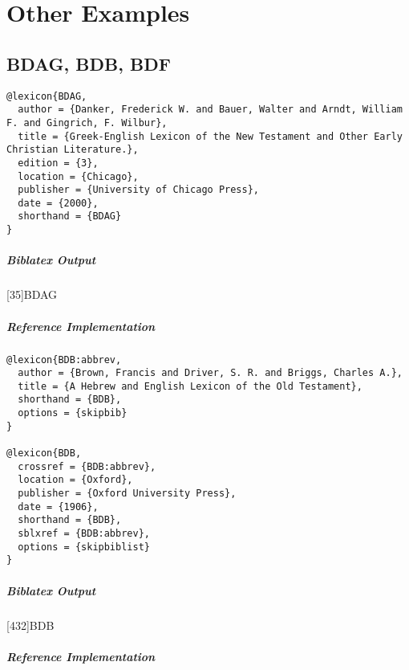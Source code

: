 \documentclass[a4paper]{article}
\newenvironment{biboutput}{%
  \subparagraph{Biblatex Output}
}{\color{black}}
\newenvironment{refimp}{%
  \subparagraph{Reference Implementation}
  \color{reference-colour}
  \rm
}{\par\color{black}}
\begin{document}
\section{Other Examples}

\subsection{BDAG, BDB, BDF}

\begin{lstlisting}
@lexicon{BDAG,
  author = {Danker, Frederick W. and Bauer, Walter and Arndt, William F. and Gingrich, F. Wilbur},
  title = {Greek-English Lexicon of the New Testament and Other Early Christian Literature.},
  edition = {3},
  location = {Chicago},
  publisher = {University of Chicago Press},
  date = {2000},
  shorthand = {BDAG}
}
\end{lstlisting}

\begin{biboutput}
  [35]{BDAG}
\end{biboutput}

\begin{refimp}
\end{refimp}

\medskip

\begin{lstlisting}
@lexicon{BDB:abbrev,
  author = {Brown, Francis and Driver, S. R. and Briggs, Charles A.},
  title = {A Hebrew and English Lexicon of the Old Testament},
  shorthand = {BDB},
  options = {skipbib}
}

@lexicon{BDB,
  crossref = {BDB:abbrev},
  location = {Oxford},
  publisher = {Oxford University Press},
  date = {1906},
  shorthand = {BDB},
  sblxref = {BDB:abbrev},
  options = {skipbiblist}
}
\end{lstlisting}

\begin{biboutput}
  [432]{BDB}
\end{biboutput}

\begin{refimp}
\end{refimp}
\end{document}
